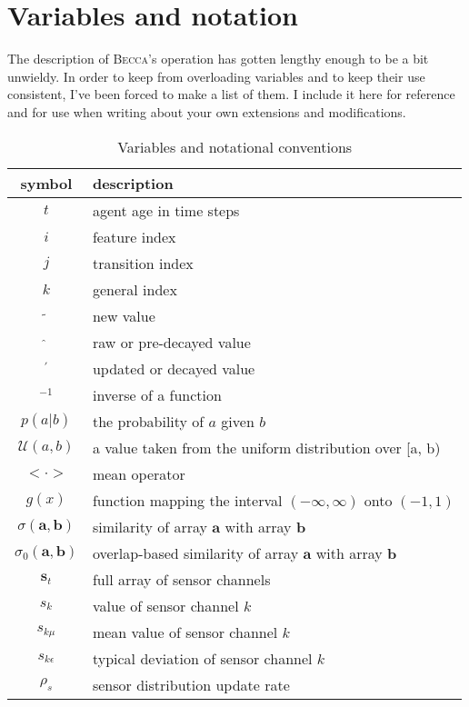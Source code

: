 \chapter{Variables and notation}
\label{notation}

The description of \textsc{Becca}'s operation has gotten lengthy enough to be a bit unwieldy. In order to keep from overloading variables and to keep their use consistent, I've been forced to make a list of them. I include it here for reference and for use when writing about your own extensions and modifications.

\begin{table}[htdp]
\caption{Variables and notational conventions}
\begin{center}
\begin{tabular}{|c|l|}
\hline
symbol & description \\
\hline
$t$ & agent age in time steps \\
$i$ & feature index \\
$j$ & transition index \\
$k$ & general index \\
$\tilde{ }$ & new value \\
$\hat{ }$ & raw or pre-decayed value \\
$ ^\prime$ & updated or decayed value \\
$^{-1}$ & inverse of a function \\ 
$p(a|b)$ & the probability of $a$ given $b$ \\
$\mathcal{U}(a,b)$ & a value taken from the uniform distribution over [a, b) \\
$ < \cdot > $ & mean operator \\
$g(x)$ & function mapping the interval $(-\infty, \infty)$ onto $(-1, 1)$ \\
$\sigma(\mathbf{a}, \mathbf{b})$ & similarity of array $\mathbf{a}$ with  array $\mathbf{b}$ \\
$\sigma_0(\mathbf{a}, \mathbf{b})$ & overlap-based similarity of array $\mathbf{a}$ with  array $\mathbf{b}$ \\
$\mathbf{s}_t$ & full array of sensor channels\\ 
$s_{k}$ & value of sensor channel $k$\\
$s_{k \mu}$ & mean value of sensor channel $k$\\
$s_{k \epsilon}$ & typical deviation of sensor channel $k$\\
$\rho_s$ & sensor distribution update rate \\

\end{tabular}
\end{center}
\end{table}
